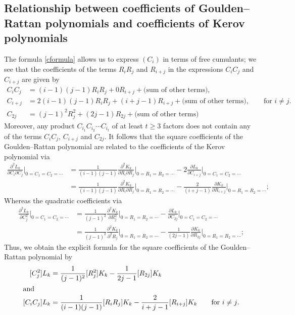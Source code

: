 \documentclass[submission]{FPSAC2021}
\begin{document}
\subsection{Relationship between coefficients 
of Goulden--Rattan polynomials 
and coefficients of Kerov polynomials}

The formula \eqref{cformula} allows us to 
express $(C_i)$ in terms of free cumulants;
we see that the coefficients of the terms 
$R_i R_j$ and $R_{i+j}$ in the expressions
$C_{i} C_{j}$ and $C_{i+j}$ are given by
\begin{align*}
C_i C_j &= (i-1)(j-1) R_i R_j + 0  R_{i+j} + \text{(sum of other terms)},\\
C_{i+j} &=2(i-1)(j-1)R_iR_j+(i+j-1)R_{i+j}+\text{(sum of other terms)}, 
\qquad \text{for $i\neq j$.}\\
C_{2j} &=(j-1)^2R_j^2+(2j-1)R_{2j}+\text{(sum of other terms)} 
\end{align*}
Moreover, any product $C_{i_1} C_{i_2}\cdots C_{i_t}$
of at least $t\geq 3$ factors does not contain any 
of the terms $C_i C_j$, $C_{i+j}$ and $C_{2j}$.
It follows that the square coefficients of 
the Goulden--Rattan polynomial are related 
to the coefficients of the Kerov polynomial via
\begin{align*}
\frac{\partial^2L_k}{\partial{C_i}\partial{C_j}}\Bigg|_{0=C_1=C_2=\cdots}
&=\frac{1}{(i-1)(j-1)}\frac{\partial^2K_k}{\partial{R_i}\partial{R_j}}\Bigg|_{0=R_1=R_2=\cdots}
-2\frac{\partial L_k}{\partial{C_{i+j}}}\Bigg|_{0=C_1=C_2=\cdots}\\
&=\frac{1}{(i-1)(j-1)}\frac{\partial^2K_k}{\partial{R_i}\partial{R_j}}\Bigg|_{0=R_1=R_2=\cdots}
-\frac{2}{(i+j-1)}\frac{\partial K_k}{\partial{R_{i+j}}}\Bigg|_{0=R_1=R_2=\cdots};
\end{align*}
Whereas the quadratic coefficients via
\begin{align*}
\frac{\partial^2L_k}{\partial{C_j^2}}\Bigg|_{0=C_1=C_2=\cdots}
&=\frac{1}{(j-1)^2}\frac{\partial^2K_k}{\partial{R_j^2}}\Bigg|_{0=R_1=R_2=\cdots}
-\frac{\partial L_k}{\partial{C_{2j}}}\Bigg|_{0=C_1=C_2=\cdots}\\
&=\frac{1}{(j-1)^2}\frac{\partial^2K_k}{\partial^2{R_j}}\Bigg|_{0=R_1=R_2=\cdots}
-\frac{1}{(2j-1)}\frac{\partial K_k}{\partial{R_{2j}}}\Bigg|_{0=R_1=R_2=\cdots};
\end{align*}
Thus, we obtain the explicit formula for 
the square coefficients of
the Goulden--Rattan polynomial by
\begin{align}
\label{formula}
[C_j^2]L_k &=\frac{1}{(j-1)^2}[R_j^2]K_k-\frac{1}{2j-1}[R_{2j}]K_k \\
\intertext{and}
[C_iC_j]L_k &=\frac{1}{(i-1)(j-1)}[R_iR_j]K_k-\frac{2}{i+j-1}[R_{i+j}]K_k
\qquad \text{for $i\neq j$.}
\end{align}
\end{document}

